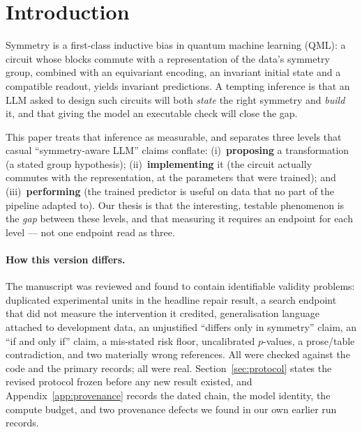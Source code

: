 \documentclass[11pt]{article}
\begin{document}
\section{Introduction}
\label{sec:intro}

Symmetry is a first-class inductive bias in quantum machine learning (QML): a circuit
whose blocks commute with a representation of the data's symmetry group, combined with an
equivariant encoding, an invariant initial state and a compatible readout, yields
invariant predictions. A tempting inference is that an LLM asked to design such circuits
will both \emph{state} the right symmetry and \emph{build} it, and that giving the model
an executable check will close the gap.

This paper treats that inference as measurable, and separates three levels that casual
``symmetry-aware LLM'' claims conflate: (i)~\textbf{proposing} a transformation (a stated
group hypothesis); (ii)~\textbf{implementing} it (the circuit actually commutes with the
representation, at the parameters that were trained); and (iii)~\textbf{performing} (the
trained predictor is useful on data that no part of the pipeline adapted to). Our thesis
is that the interesting, testable phenomenon is the \emph{gap} between these levels, and
that measuring it requires an endpoint for each level --- not one endpoint read as three.

\paragraph{How this version differs.} The manuscript was reviewed and found to contain
identifiable validity problems: duplicated experimental units in the headline repair
result, a search endpoint that did not measure the intervention it credited, generalisation
language attached to development data, an unjustified ``differs only in symmetry'' claim,
an ``if and only if'' claim, a mis-stated risk floor, uncalibrated $p$-values, a
prose/table contradiction, and two materially wrong references. All were checked against
the code and the primary records; all were real. Section~\ref{sec:protocol} states the
revised protocol frozen before any new result existed, and
Appendix~\ref{app:provenance} records the dated chain, the model identity, the compute
budget, and two provenance defects we found in our own earlier run records.
\end{document}
